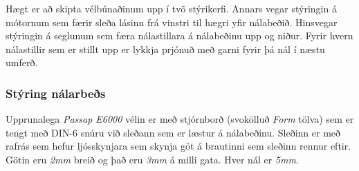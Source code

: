 Hægt er að skipta vélbúnaðinum upp í tvö stýrikerfi. Annars vegar stýringin á mótornum sem færir sleða lásinn frá vinstri til hægri yfir nálabeðið. Hinsvegar stýringin á seglunum sem færa nálastillara á nálabeðinu upp og niður. Fyrir hvern nálastillir sem er stillt upp er lykkja prjónuð með garni fyrir þá nál í næstu umferð.
\subsubsection{Stýring nálarbeðs}
Upprunalega \textit{Passap E6000} vélin er með stjórnborð (svokölluð \textit{Form} tölva) sem er tengt með DIN-6 snúru við sleðann sem er læstur á nálabeðinu. Sleðinn er
með rafrás sem hefur ljósskynjara sem skynja göt á brautinni sem sleðinn rennur eftir. Götin eru \textit{2mm} breið og það eru \textit{3mm} á milli gata. Hver nál er \textit{5mm}. 

